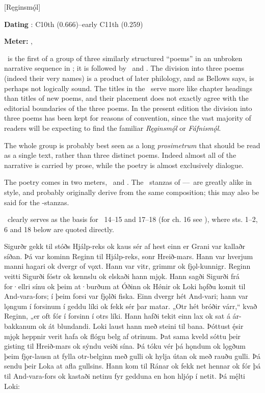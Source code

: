 [Ręginsmǫ́l]

\begin{flushright}%
\textbf{Dating} \parencite{Sapp2022}: C10th (0.666)–early C11th (0.259)

\textbf{Meter:} \Ljodahattr, \Fornyrdislag%
\end{flushright}

\Reginsmal\ is the first of a group of three similarly structured “poems” in an unbroken narrative sequence in \Regius; it is followed by \Fafnismal\ and \Sigrdrifumal.  The division into three poems (indeed their very names) is a product of later philology, and as Bellows says, is perhaps not logically sound.  The titles in the \Regius\ serve more like chapter headings than titles of new poems, and their placement does not exactly agree with the editorial boundaries of the three poems.  In the present edition the division into three poems has been kept for reasons of convention, since the vast majority of readers will be expecting to find the familiar \emph{Ręginsmǫ́l} or \emph{Fáfnismǫ́l}.

The whole group is probably best seen as a long \emph{prosimetrum} that should be read as a single text, rather than three distinct poems.  Indeed almost all of the narrative is carried by prose, while the poetry is almost exclusively dialogue.

The poetry comes in two meters, \Ljodahattr\ and \Fornyrdislag.  The \Ljodahattr\ stanzas of \Reginsmal–\Fafnismal–\Sigrdrifumal\ are greatly alike in style, and probably originally derive from the same composition; this may also be said for the \Fornyrdislag-stanzas.

\Reginsmal\ clearly serves as the basis for \VolsungaSaga\ 14–15 and 17–18 (for ch. 16 see \Gripisspa), where sts. 1–2, 6 and 18 below are quoted directly.

\sectionline

\bpg\bpa Sigurðr gekk til stóðs Hjálp-reks ok kaus sér af hest einn er Grani var kallaðr síðan. Þá var kominn Reginn til Hjálp-reks, sonr Hreið-mars. Hann var hverjum manni hagari ok dvergr of vǫxt. Hann var vitr, grimmr ok fjǫl-kunnigr. Reginn veitti Sigurði fóstr ok kennslu ok elskaði hann mjǫk. Hann sagði Sigurði frá for·ellri sínu ok þeim at·burðum at Óðinn ok Hǿnir ok Loki hǫfðu komit til And-vara-fors; í þeim forsi var fjǫlði fiska. Einn dvergr hét And-vari; hann var lǫngum í forsinum í geddu líki ok fekk sér þar matar. „Otr hét bróðir várr,“ kvað Reginn, „er oft fór í forsinn í otrs líki. Hann hafði tekit einn lax ok sat á ár-bakkanum ok át blundandi. Loki laust hann með steini til bana. Þóttust ę́sir mjǫk heppnir verit hafa ok flógu belg af otrinum. Þat sama kveld sóttu þeir gisting til Hreið-mars ok sýndu veiði sína. Þá tóku vér þá hǫndum ok lǫgðum þeim fjǫr-lausn at fylla otr-belginn með gulli ok hylja útan ok með rauðu gulli. Þá sendu þeir Loka at afla gullsins. Hann kom til Ránar ok fekk net hennar ok fór þá til And-vara-fors ok kastaði netinu fyr gedduna en hon hljóp í netit. Þá mę́lti Loki:\epa

